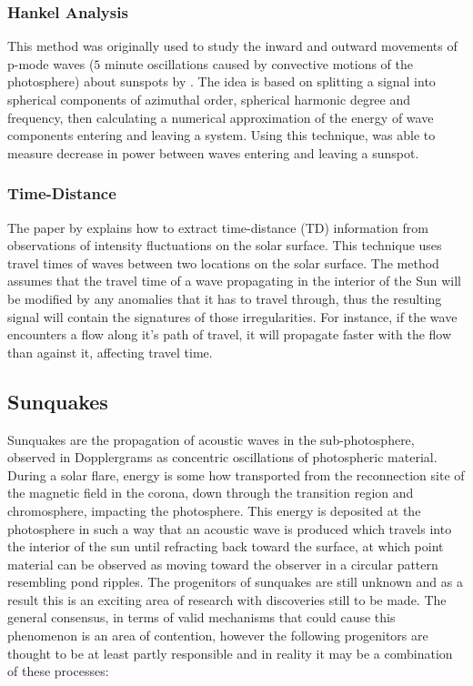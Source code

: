 \documentclass[11pt]{article}
\begin{document}
\subsubsection{Hankel Analysis}\label{hankel}
This method was originally used to study the inward and outward movements of p-mode waves ($5$ minute oscillations caused by convective motions of the photosphere) about sunspots by \cite{1987ApJ...319L..27B}. The idea is based on splitting a signal into spherical components of azimuthal order, spherical harmonic degree and frequency, then calculating a numerical approximation of the energy of wave components entering and leaving a system. Using this technique, \cite{1987ApJ...319L..27B} was able to measure decrease in power between waves entering and leaving a sunspot.    


\subsubsection{Time-Distance}\label{TD}
The paper by \cite{1993Natur.362..430D} explains how to extract time-distance (TD) information from observations of intensity fluctuations on the solar surface. This technique uses travel times of waves between two locations on the solar surface. The method assumes that the travel time of a wave propagating in the interior of the Sun will be modified by any anomalies that it has to travel through, thus the resulting signal will contain the signatures of those irregularities. For instance, if the wave encounters a flow along it's path of travel, it will propagate faster with the flow than against it, affecting travel time.     

\subsection{Sunquakes}\label{SQK}
Sunquakes are the propagation of acoustic waves in the sub-photosphere, observed in Dopplergrams as concentric oscillations of photospheric material. During a solar flare, energy is some how transported from the reconnection site of the magnetic field in the corona, down through the transition region and chromosphere, impacting the photosphere. This energy is deposited at the photosphere in such a way that an acoustic wave is produced which travels into the interior of the sun until refracting back toward the surface, at which point material can be observed as moving toward the observer in a circular pattern resembling pond ripples. The progenitors of sunquakes are still unknown and as a result this is an exciting area of research with discoveries still to be made. The general consensus, in terms of valid mechanisms that could cause this phenomenon is an area of contention, however the following progenitors are thought to be at least partly responsible and in reality it may be a combination of these processes: 
\end{document}
